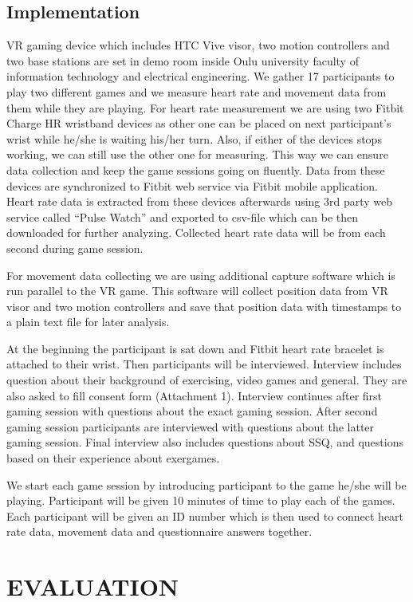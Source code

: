 \documentclass{sig-alternate-05-2015}
\begin{document}
\subsection{Implementation}
VR gaming device which includes HTC Vive visor, two motion controllers and 
two base stations are set in demo room inside Oulu university faculty of 
information technology and electrical engineering. We gather 17 participants 
to play two different games and we measure heart rate and movement data from 
them while they are playing. For heart rate measurement we are using two 
Fitbit Charge HR wristband devices as other one can be placed on next participant’s 
wrist while he/she is waiting his/her turn. Also, if either of the devices 
stops working, we can still use the other one for measuring. This way we 
can ensure data collection and keep the game sessions going on fluently. 
Data from these devices are synchronized to Fitbit web service via Fitbit 
mobile application. Heart rate data is extracted from these devices afterwards 
using 3rd party web service called “Pulse Watch” and exported to csv-file which 
can be then downloaded for further analyzing. Collected heart rate data will 
be from each second during game session.

For movement data collecting we are using additional capture software which 
is run parallel to the VR game. This software will collect position data from 
VR visor and two motion controllers and save that position data with timestamps 
to a plain text file for later analysis. 

At the beginning the participant is sat down and Fitbit heart rate bracelet 
is attached to their wrist. Then participants will be interviewed. Interview 
includes question about their background of exercising, video games and general. 
They are also asked to fill consent form (Attachment 1). Interview continues after 
first gaming session with questions about the exact gaming session. After second 
gaming session participants are interviewed with questions about the latter gaming 
session. Final interview also includes questions about SSQ, and questions based 
on their experience about exergames. 

We start each game session by introducing participant to the game he/she will be 
playing. Participant will be given 10 minutes of time to play each of the games. 
Each participant will be given an ID number which is then used to connect heart 
rate data, movement data and questionnaire answers together.

\section{EVALUATION}
\end{document}
